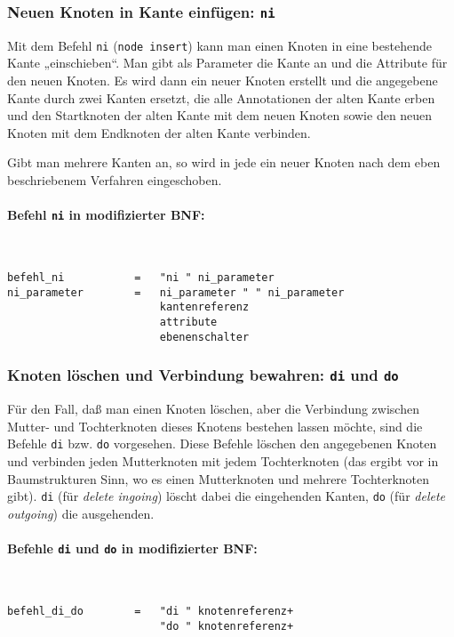 \documentclass[12pt]{scrartcl}
\begin{document}
\subsubsection{Neuen Knoten in Kante einfügen: \texttt{ni}}

Mit dem Befehl \texttt{ni} (\texttt{node insert}) kann man einen Knoten in eine bestehende Kante „einschieben“. Man gibt als Parameter die Kante an und die Attribute für den neuen Knoten. Es wird dann ein neuer Knoten erstellt und die angegebene Kante durch zwei Kanten ersetzt, die alle Annotationen der alten Kante erben und den Startknoten der alten Kante mit dem neuen Knoten sowie den neuen Knoten mit dem Endknoten der alten Kante verbinden.

Gibt man mehrere Kanten an, so wird in jede ein neuer Knoten nach dem eben beschriebenem Verfahren eingeschoben.

\paragraph*{Befehl \texttt{ni} in modifizierter BNF:}
~
\begin{framed}
\begin{lstlisting}
befehl_ni           =   "ni " ni_parameter
ni_parameter        =   ni_parameter " " ni_parameter
                        kantenreferenz
                        attribute
                        ebenenschalter
\end{lstlisting}
\end{framed}


\subsubsection{Knoten löschen und Verbindung bewahren: \texttt{di} und \texttt{do}}

Für den Fall, daß man einen Knoten löschen, aber die Verbindung zwischen Mutter- und Tochterknoten dieses Knotens bestehen lassen möchte, sind die Befehle \texttt{di} bzw. \texttt{do} vorgesehen. Diese Befehle löschen den angegebenen Knoten und verbinden jeden Mutterknoten mit jedem Tochterknoten (das ergibt vor in Baumstrukturen Sinn, wo es einen Mutterknoten und mehrere Tochterknoten gibt). \texttt{di} (für \textit{delete ingoing}) löscht dabei die eingehenden Kanten, \texttt{do} (für \textit{delete outgoing}) die ausgehenden.

\paragraph*{Befehle \texttt{di} und \texttt{do} in modifizierter BNF:}
~
\begin{framed}
\begin{lstlisting}
befehl_di_do        =   "di " knotenreferenz+
                        "do " knotenreferenz+
\end{lstlisting}
\end{framed}
\end{document}
